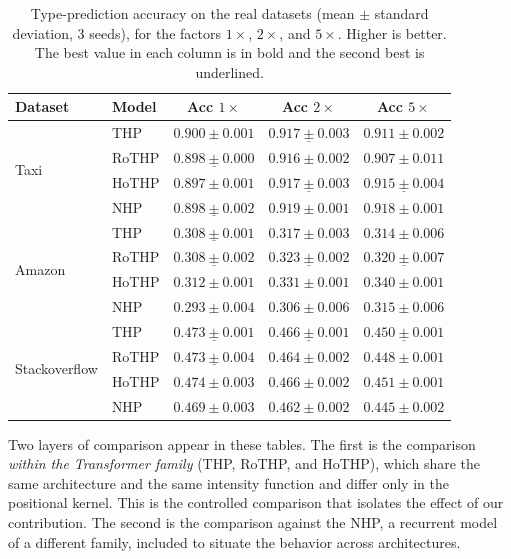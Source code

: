 \begin{table}[h!]
\centering
\caption{Type-prediction accuracy on the real datasets (mean $\pm$ standard deviation, 3 seeds), for the factors $1\times$, $2\times$, and $5\times$. Higher is better. The best value in each column is in bold and the second best is underlined.}
\label{tab:acc-reais}
\begin{tabular}{llccc}
\toprule
Dataset & Model & Acc $1\times$ & Acc $2\times$ & Acc $5\times$ \\
\midrule
\multirow{4}{*}{Taxi}
    & THP    & $\mathbf{0.900 \pm 0.001}$ & $\underline{0.917 \pm 0.003}$ & $0.911 \pm 0.002$ \\
    & RoTHP  & $\underline{0.898 \pm 0.000}$ & $0.916 \pm 0.002$ & $0.907 \pm 0.011$ \\
    & HoTHP  & $0.897 \pm 0.001$ & $\underline{0.917 \pm 0.003}$ & $\underline{0.915 \pm 0.004}$ \\
    & NHP    & $\underline{0.898 \pm 0.002}$ & $\mathbf{0.919 \pm 0.001}$ & $\mathbf{0.918 \pm 0.001}$ \\
\midrule
\multirow{4}{*}{Amazon}
    & THP    & $\underline{0.308 \pm 0.001}$ & $0.317 \pm 0.003$ & $0.314 \pm 0.006$ \\
    & RoTHP  & $\underline{0.308 \pm 0.002}$ & $\underline{0.323 \pm 0.002}$ & $\underline{0.320 \pm 0.007}$ \\
    & HoTHP  & $\mathbf{0.312 \pm 0.001}$ & $\mathbf{0.331 \pm 0.001}$ & $\mathbf{0.340 \pm 0.001}$ \\
    & NHP    & $0.293 \pm 0.004$ & $0.306 \pm 0.006$ & $0.315 \pm 0.006$ \\
\midrule
\multirow{4}{*}{Stackoverflow}
    & THP    & $\underline{0.473 \pm 0.001}$ & $\underline{0.466 \pm 0.001}$ & $\underline{0.450 \pm 0.001}$ \\
    & RoTHP  & $\underline{0.473 \pm 0.004}$ & $0.464 \pm 0.002$ & $0.448 \pm 0.001$ \\
    & HoTHP  & $\mathbf{0.474 \pm 0.003}$ & $\mathbf{0.466 \pm 0.002}$ & $\mathbf{0.451 \pm 0.001}$ \\
    & NHP    & $0.469 \pm 0.003$ & $0.462 \pm 0.002$ & $0.445 \pm 0.002$ \\
\bottomrule
\end{tabular}
\end{table}

Two layers of comparison appear in these tables. The first is the comparison \textit{within the Transformer family} (THP, RoTHP, and HoTHP), which share the same architecture and the same intensity function and differ only in the positional kernel. This is the controlled comparison that isolates the effect of our contribution. The second is the comparison against the NHP, a recurrent model of a different family, included to situate the behavior across architectures.

